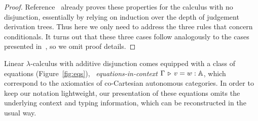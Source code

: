 \documentclass[submission,copyright,creativecommons]{eptcs}
\begin{document}
\begin{proof}
        Reference~\cite{dahlqvist23b} already proves these properties for the
        calculus with no disjunction, essentially by relying on induction over
        the depth of judgement derivation trees. Thus here we only need to
        address the three rules that concern conditionals. It turns out that
        these three cases follow analogously to the cases presented
        in~\cite{dahlqvist23b}, so we omit proof details.
\end{proof}

\noindent
Linear $\lambda$-calculus with additive disjunction comes equipped with a class
of equations (Figure~\ref{fig:eqs}), \ie\ \emph{equations-in-context} $\Gamma
\, \triangleright \, v = w : \mathbb{A}$, which correspond to the axiomatics of co-Cartesian
autonomous categories. In order to keep our notation lightweight, our
presentation of these equations omits the underlying context and typing
information, which can be reconstructed in the usual way. 
\end{document}
